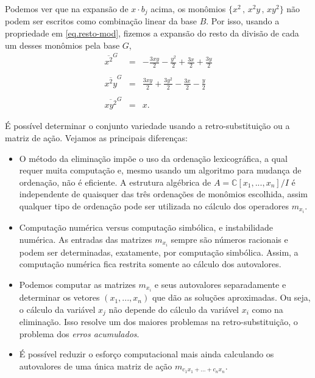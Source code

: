 Podemos ver que na expansão de $x\cdot b_j$ acima, os monômios $\{x^2\,,\,x^2y\,,\,xy^2\}$ não podem ser escritos como combinação linear da base $B$. Por isso, usando a propriedade em \ref{eq.resto-mod}, fizemos a expansão do resto da divisão de cada um desses monômios pela base $G$,
\begin{equation*}
\begin{array}{rcl}
\overline{x^2}^{G}&=&-\frac{3xy}{2}-\frac{y^2}{2}+\frac{3x}{2}+\frac{3y}{2}\\\\
\overline{x^2y}^{G}&=&\frac{3xy}{2}+\frac{3y^2}{2}-\frac{3x}{2}-\frac{y}{2}\\\\
\overline{xy^2}^{G}&=&x.
\end{array}
\end{equation*}

É possível determinar o conjunto variedade usando a retro-substituição ou a matriz de ação. Vejamos as principais diferenças:
\begin{itemize}
\item O método da eliminação impõe o uso da ordenação
lexicográfica, a qual requer muita computação e, mesmo usando um algoritmo para mudança de ordenação, não é eficiente. A estrutura algébrica de $A={\mathbb{C}}[x_1,...,x_n]/I$
é independente de quaisquer das três ordenações de monômios escolhida, assim qualquer tipo de ordenação pode ser utilizada no cálculo dos operadores $m_{x_i}$.
\item Computação numérica versus computação simbólica, e instabilidade numérica. As entradas das matrizes $m_{x_i}$ sempre são números racionais e podem ser determinadas, exatamente, por
computação simbólica. Assim, a computação numérica fica restrita somente ao cálculo dos
autovalores.
\item  Podemos computar as matrizes $m_{x_i}$ 
 e seus autovalores separadamente e determinar os
vetores $(x_1,...,x_n)$
 que dão as soluções aproximadas. Ou seja, o cálculo da variável $x_j$
não depende do cálculo da variável $x_i$
 como na eliminação. Isso resolve um dos maiores problemas na retro-substituição, o problema dos {\it erros acumulados}.

\item É possível reduzir o esforço computacional mais ainda calculando os autovalores de uma única matriz de ação $m_{c_1x_1+...+c_nx_n}$.

\end{itemize}
\newpage








